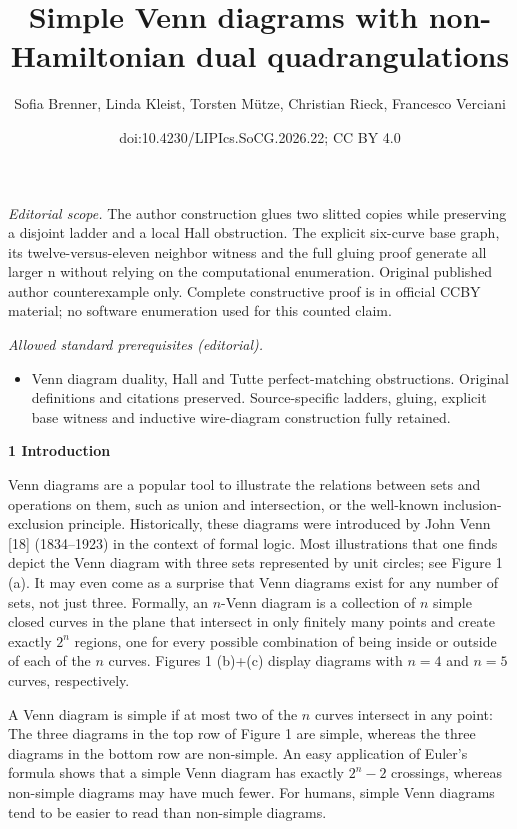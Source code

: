 \documentclass[10pt,a4paper]{article}
\title{Simple Venn diagrams with non-Hamiltonian dual quadrangulations}
\author{Sofia Brenner, Linda Kleist, Torsten Mütze, Christian Rieck, Francesco Verciani}
\date{doi:10.4230/LIPIcs.SoCG.2026.22; CC BY 4.0}
\begin{document}
\maketitle
\noindent\textit{Editorial scope.} The author construction glues two slitted copies while preserving a disjoint ladder and a local Hall obstruction. The explicit six-curve base graph, its twelve-versus-eleven neighbor witness and the full gluing proof generate all larger n without relying on the computational enumeration. Original published author counterexample only. Complete constructive proof is in official CCBY material; no software enumeration used for this counted claim.\par\medskip
\noindent\textit{Allowed standard prerequisites (editorial).}\begin{itemize}
\item Venn diagram duality, Hall and Tutte perfect-matching obstructions. Original definitions and citations preserved. Source-specific ladders, gluing, explicit base witness and inductive wire-diagram construction fully retained.
\end{itemize}\medskip
\par\medskip\noindent\textbf{1 Introduction}\par
Venn diagrams are a popular tool to illustrate the relations between sets and operations on them, such as union and intersection, or the well-known inclusion-exclusion principle. Historically, these diagrams were introduced by John Venn [18] (1834–1923) in the context of formal logic. Most illustrations that one finds depict the Venn diagram with three sets represented by unit circles; see Figure 1 (a). It may even come as a surprise that Venn diagrams exist for any number of sets, not just three. Formally, an $n$-Venn diagram is a collection of $n$ simple closed curves in the plane that intersect in only finitely many points and create exactly $2^{n}$ regions, one for every possible combination of being inside or outside of each of the $n$ curves. Figures 1 (b)+(c) display diagrams with $n=4$ and $n=5$ curves, respectively.
\par
\par
A Venn diagram is simple if at most two of the $n$ curves intersect in any point: The three diagrams in the top row of Figure 1 are simple, whereas the three diagrams in the bottom row are non-simple. An easy application of Euler’s formula shows that a simple Venn diagram has exactly $2^{n}-2$ crossings, whereas non-simple diagrams may have much fewer. For humans, simple Venn diagrams tend to be easier to read than non-simple diagrams.
\end{document}
